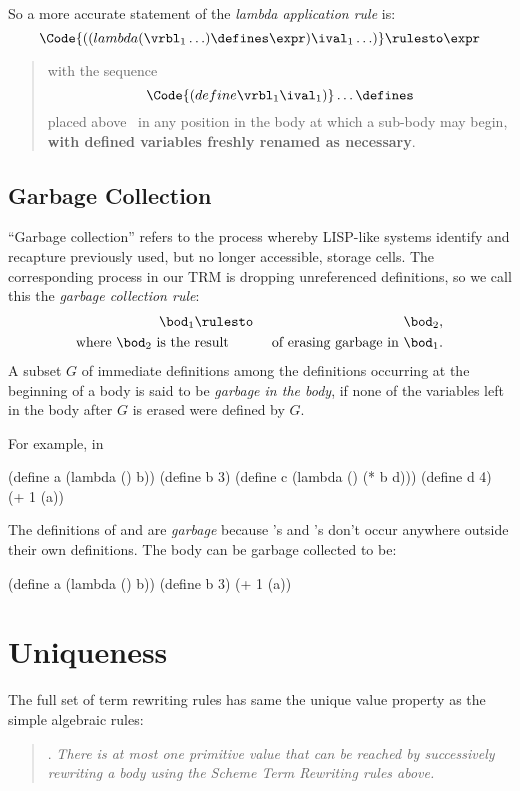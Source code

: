 \documentclass[11pt]{article}
\begin{document}
So a more accurate statement of the {\em lambda application rule} is:
\[\Code{((lambda (\vrbl_{1} \ldots) \defines \expr) \ival_{1} \ldots)} \rulesto
\expr\]
\begin{quote}
with the sequence
\[\Code{(define \vrbl_1 \ival_{1})}  \ldots \defines\]
placed above \expr\ in any position in the body at which a sub-body may
begin, {\bf with defined variables freshly renamed as necessary}.
\end{quote}

\subsection{Garbage Collection}

``Garbage collection'' refers to the process whereby LISP-like systems
identify and recapture previously used, but no longer accessible, storage
cells.  The corresponding process in our TRM is dropping
unreferenced definitions, so we call this the {\em garbage collection
rule}:
\begin{eqnarray*}
\bod_1 & \rulesto& \bod_2,\\
\mbox{where $\bod_2$ is the } & \mbox{result} & \mbox{ of erasing garbage in $\bod_1$}.
\end{eqnarray*}
A subset $G$ of immediate definitions among the definitions occurring at
the beginning of a body is said to be {\em garbage in the body}, if none
of the variables left in the body after $G$ is erased were defined by $G$.

For example, in
\begin{lisp}
(define a (lambda () b))
(define b 3)
(define c (lambda () (* b d)))
(define d 4)
(+ 1 (a))
\end{lisp}
The definitions of  and  are {\em garbage} because
's and 's don't occur anywhere outside their own
definitions.  The body can be garbage collected to be:
\begin{lisp}
(define a (lambda () b))
(define b 3)
(+ 1 (a))
\end{lisp}


\section{Uniqueness}

The full set of term rewriting rules has same the unique value
property as the simple algebraic rules:
\begin{quote}
.  {\em There is at most one
primitive value that can be reached by successively rewriting a body using
the Scheme Term Rewriting rules above.}
\end{quote}
\end{document}
